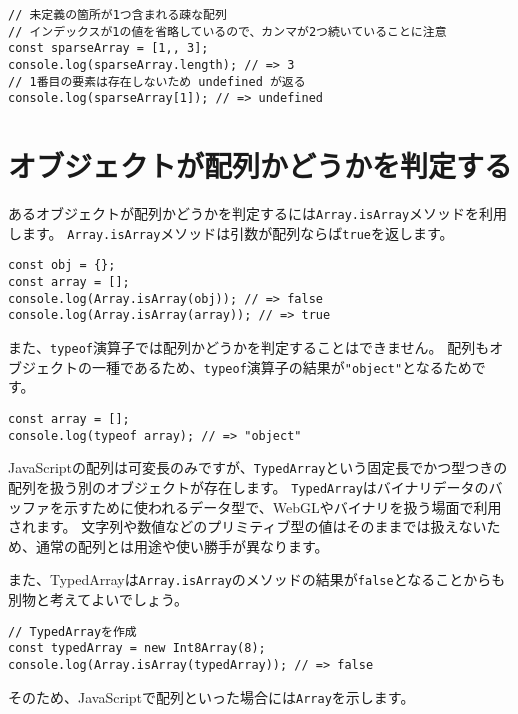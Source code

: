 \begin{lstlisting}
// 未定義の箇所が1つ含まれる疎な配列
// インデックスが1の値を省略しているので、カンマが2つ続いていることに注意
const sparseArray = [1,, 3];
console.log(sparseArray.length); // => 3 
// 1番目の要素は存在しないため undefined が返る
console.log(sparseArray[1]); // => undefined
\end{lstlisting}

\hypertarget{detect-array}{%
\section{オブジェクトが配列かどうかを判定する}\label{detect-array}}

あるオブジェクトが配列かどうかを判定するには\texttt{Array.isArray}メソッドを利用します。
\texttt{Array.isArray}メソッドは引数が配列ならば\texttt{true}を返します。

\begin{lstlisting}
const obj = {};
const array = [];
console.log(Array.isArray(obj)); // => false
console.log(Array.isArray(array)); // => true
\end{lstlisting}

また、\texttt{typeof}演算子では配列かどうかを判定することはできません。
配列もオブジェクトの一種であるため、\texttt{typeof}演算子の結果が\texttt{"object"}となるためです。

\begin{lstlisting}
const array = [];
console.log(typeof array); // => "object"
\end{lstlisting}

\begin{tcolorbox}[title=TypedArray\,\protect\icon{fig/es2015.eps}]\label{typed-array}

JavaScriptの配列は可変長のみですが、\texttt{TypedArray}という固定長でかつ型つきの配列を扱う別のオブジェクトが存在します。
\texttt{TypedArray}はバイナリデータのバッファを示すために使われるデータ型で、WebGLやバイナリを扱う場面で利用されます。
文字列や数値などのプリミティブ型の値はそのままでは扱えないため、通常の配列とは用途や使い勝手が異なります。

また、TypedArrayは\texttt{Array.isArray}のメソッドの結果が\texttt{false}となることからも別物と考えてよいでしょう。

\begin{lstlisting}
// TypedArrayを作成
const typedArray = new Int8Array(8);
console.log(Array.isArray(typedArray)); // => false
\end{lstlisting}

そのため、JavaScriptで配列といった場合には\texttt{Array}を示します。
\end{tcolorbox}

